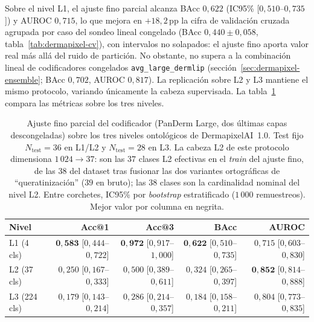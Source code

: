 Sobre el nivel L1, el ajuste fino parcial alcanza BAcc $0{,}622$
(IC95\% [$0{,}510$--$0{,}735$]) y AUROC $0{,}715$, lo que mejora en
$+18{,}2$\,pp la cifra de validación cruzada agrupada por caso del
sondeo lineal congelado (BAcc $0{,}440 \pm 0{,}058$,
tabla~\ref{tab:dermapixel-cv}), con intervalos no solapados: el
ajuste fino aporta valor real más allá del ruido de partición. No
obstante, no supera a la combinación lineal de codificadores
congelados \texttt{avg\_large\_dermlip}
(sección~\ref{sec:dermapixel-ensemble}; BAcc $0{,}702$, AUROC
$0{,}817$). La replicación sobre L2 y L3 mantiene el mismo
protocolo, variando únicamente la cabeza supervisada. La
tabla~\ref{tab:dermapixel-ft-multilevel} compara las métricas
sobre los tres niveles.

\begin{table}[htbp]
\centering
\footnotesize
\setlength{\tabcolsep}{4pt}
\renewcommand{\arraystretch}{0.95}
\caption{Ajuste fino parcial del codificador (PanDerm Large, dos
últimas capas descongeladas) sobre los tres niveles ontológicos de
DermapixelAI~1.0. Test fijo $N_{\mathrm{test}} = 36$ en L1/L2 y
$N_{\mathrm{test}} = 28$ en L3. La cabeza L2 de este protocolo
dimensiona $1\,024 \to 37$: son las $37$ clases L2 efectivas en el
\emph{train} del ajuste fino, de las $38$ del dataset tras fusionar
las dos variantes ortográficas de ``queratinización'' ($39$ en
bruto); las $38$ clases son la cardinalidad nominal del nivel L2.
Entre corchetes, IC95\% por \emph{bootstrap}
estratificado ($1\,000$ remuestreos). Mejor valor por columna en
negrita.}
\label{tab:dermapixel-ft-multilevel}
\begin{tabular}{lrrrr}
\hline
Nivel        & Acc@1                            & Acc@3                            & BAcc                             & AUROC \\
\hline
L1 (4 cls)   & $\mathbf{0{,}583}$ [$0{,}444$--$0{,}722$] & $\mathbf{0{,}972}$ [$0{,}917$--$1{,}000$] & $\mathbf{0{,}622}$ [$0{,}510$--$0{,}735$] & $0{,}715$ [$0{,}603$--$0{,}830$] \\
L2 (37 cls)  & $0{,}250$ [$0{,}167$--$0{,}333$] & $0{,}500$ [$0{,}389$--$0{,}611$] & $0{,}324$ [$0{,}265$--$0{,}397$] & $\mathbf{0{,}852}$ [$0{,}814$--$0{,}888$] \\
L3 (224 cls) & $0{,}179$ [$0{,}143$--$0{,}214$] & $0{,}286$ [$0{,}214$--$0{,}357$] & $0{,}184$ [$0{,}158$--$0{,}211$] & $0{,}804$ [$0{,}773$--$0{,}835$] \\
\hline
\end{tabular}
\end{table}

